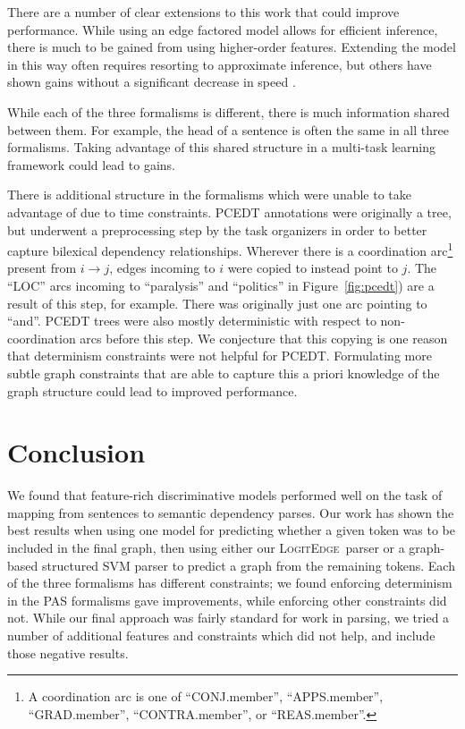 \documentclass[11pt]{article}
\newcommand{\logitedge}{\textsc{LogitEdge}}
\begin{document}
There are a number of clear extensions to this work that could improve
performance.
While using an edge factored model allows for efficient inference, there is
much to be gained from using higher-order features.
Extending the model in this way often requires resorting to approximate
inference, but others have shown gains without a significant decrease in
speed \cite{mcdonald_online_2006,martins_turning_2013}.

While each of the three formalisms is different, there is much information
shared between them.
For example, the head of a sentence is often the same in all three formalisms.
Taking advantage of this shared structure in a multi-task learning framework
could lead to gains.

There is additional structure in the formalisms which were unable to take
advantage of due to time constraints.
PCEDT annotations were originally a tree, but underwent a preprocessing step by
the task organizers in order to better capture bilexical dependency
relationships.
Wherever there is a coordination arc\footnote{A coordination arc
is one of ``CONJ.member'', ``APPS.member'', ``GRAD.member'', ``CONTRA.member'',
or ``REAS.member''.} present from $i \rightarrow j$, edges incoming to $i$ were
copied to instead point to $j$.
The ``LOC'' arcs incoming to ``paralysis'' and ``politics'' in
Figure~\ref{fig:pcedt}) are a result of this step, for example.
There was originally just one arc pointing to ``and''.
PCEDT trees were also mostly deterministic with respect to non-coordination arcs
before this step.
We conjecture that this copying is one reason that determinism constraints were
not helpful for PCEDT.
Formulating more subtle graph constraints that are able to capture this a priori
knowledge of the graph structure could lead to improved performance.


\section{Conclusion}
We found that feature-rich discriminative models performed well on the task of
mapping from sentences to semantic dependency parses.
Our work has shown the best results when using one model for predicting whether
a given token was to be included in the final graph, then using either our
\logitedge\ parser or a graph-based structured SVM parser to predict a graph
from the remaining tokens.
Each of the three formalisms has different constraints;
we found enforcing determinism in the PAS formalisms gave improvements, while
enforcing other constraints did not.
While our final approach was fairly standard for work in parsing, we tried a
number of additional features and constraints which did not help, and include
those negative results.
\end{document}
